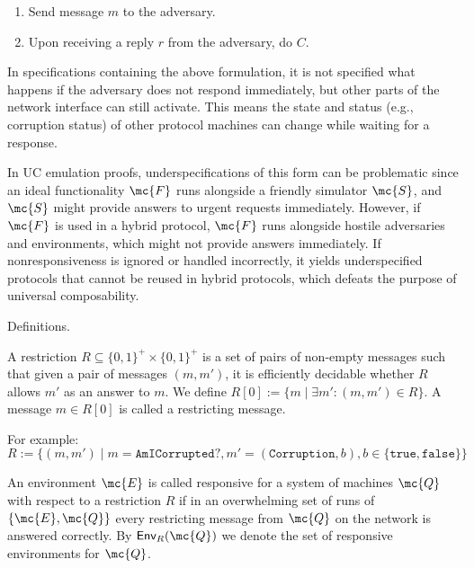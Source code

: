 \begin{enumerate}
  \item Send message $m$ to the adversary.
  \item Upon receiving a reply $r$ from the adversary, do $C$.
\end{enumerate}

In specifications containing the above formulation, it is not specified what
happens if the adversary does not respond immediately, but other parts of the
network interface can still activate. This means the state and status (e.g.,
corruption status) of other protocol machines can change while waiting for a
response.

In UC emulation proofs, underspecifications of this form can be problematic
since an ideal functionality $\mc{F}$ runs alongside a friendly simulator
$\mc{S}$, and $\mc{S}$ might provide answers to urgent requests
immediately. However, if $\mc{F}$ is used in a hybrid protocol, $\mc{F}$ runs
alongside hostile adversaries and environments, which might not provide answers
immediately. If nonresponsiveness is ignored or handled incorrectly, it yields
underspecified protocols that cannot be reused in hybrid protocols, which
defeats the purpose of universal composability.

Definitions.

\begin{definition}[Restriction]
  A restriction $R \subseteq \{0, 1\}^{+} \times \{0, 1 \}^{+}$ is a set of pairs of non-empty
  messages such that given a pair of messages $(m, m')$, it is efficiently
  decidable whether $R$ allows $m'$ as an answer to $m$. We define $R[0] := \{ m
  \mid \exists m' \colon (m, m') \in R \}$. A message $m \in R[0]$ is called a restricting
  message.
\end{definition}

For example:
\[ R := \{ (m, m') \mid m = \texttt{AmICorrupted?}, m' = (\texttt{Corruption}, b),
b \in \{\texttt{true}, \texttt{false}\}\} \]

\begin{definition}
  An environment $\mc{E}$ is called responsive for a system of machines $\mc{Q}$ with
  respect to a restriction $R$ if in an overwhelming set of runs of $\{\mc{E},
  \mc{Q}\}$ every restricting message from $\mc{Q}$ on the network is answered
  correctly. By $\textsf{Env}_{R}(\mc{Q})$ we denote the set of responsive
  environments for $\mc{Q}$.
\end{definition}

